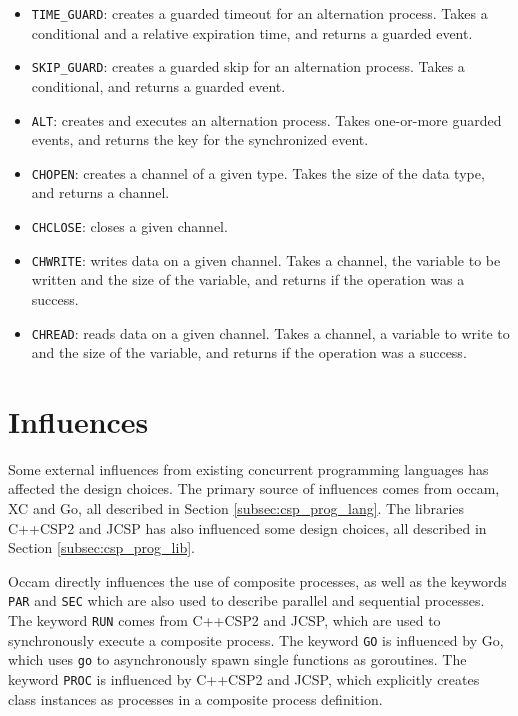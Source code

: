 \begin{itemize}[topsep=0em,itemsep=-1em,partopsep=0.5em,parsep=1em]
    \item \texttt{TIME\_GUARD}: creates a guarded timeout for an alternation process. Takes a conditional and a relative expiration time, and returns a guarded event.
    \item \texttt{SKIP\_GUARD}: creates a guarded skip for an alternation process. Takes a conditional, and returns a guarded event.
    \item \texttt{ALT}: creates and executes an alternation process. Takes one\hyp{}or\hyp{}more guarded events, and returns the key for the synchronized event. 
    \item \texttt{CHOPEN}: creates a channel of a given type. Takes the size of the data type, and returns a channel.
    \item \texttt{CHCLOSE}: closes a given channel.
    \item \texttt{CHWRITE}: writes data on a given channel. Takes a channel, the variable to be written and the size of the variable, and returns if the operation was a success.
    \item \texttt{CHREAD}: reads data on a given channel. Takes a channel, a variable to write to and the size of the variable, and returns if the operation was a success.
\end{itemize}

\section{Influences}
\label{sec:influences}

Some external influences from existing concurrent programming languages has affected the design choices. The primary source of influences comes from occam, XC and Go, all described in Section \ref{subsec:csp_prog_lang}. The libraries C++CSP2 and JCSP has also influenced some design choices, all described in Section \ref{subsec:csp_prog_lib}.

Occam directly influences the use of composite processes, as well as the keywords \texttt{PAR} and \texttt{SEC} which are also used to describe parallel and sequential processes. The keyword \texttt{RUN} comes from C++CSP2 and JCSP, which are used to synchronously execute a composite process. The keyword \texttt{GO} is influenced by Go, which uses \texttt{go} to asynchronously spawn single functions as goroutines. The keyword \texttt{PROC} is influenced by C++CSP2 and JCSP, which explicitly creates class instances as processes in a composite process definition. 

